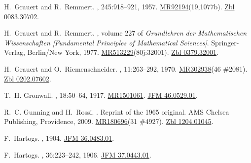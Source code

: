 \documentclass[11pt,a4paper, final, twoside]{article}
\numberwithin{equation}{section}
\begin{document}
\begin{appendices}
\begin{thebibliography}{100}
H.~Grauert and R.~Remmert.
, 245:918--921, 1957.
\newblock
  \href{http://www.ams.org/mathscinet-getitem?mr=92194}{MR92194}(19,1077b).
  \href{http://zbmath.org/?q=an:0083.30702}{Zbl 0083.30702}.

H.~Grauert and R.~Remmert.
, volume 227 of {\em
  Grundlehren der Mathematischen Wissenschaften [Fundamental Principles of
  Mathematical Sciences]}.
\newblock Springer-Verlag, Berlin/New York, 1977.
\newblock
  \href{http://www.ams.org/mathscinet-getitem?mr=513229}{MR513229}(80j:32001).
  \href{http://zbmath.org/?q=an:0379.32001}{Zbl 0379.32001}.

H.~Grauert and O.~Riemenschneider.
, 11:263--292, 1970.
\newblock \href{http://www.ams.org/mathscinet-getitem?mr=302938}{MR302938}(46
  \#2081). \href{http://zbmath.org/?q=an:0202.07602}{Zbl 0202.07602}.

T.~H. Gronwall.
, 18:50--64,
  1917.
\newblock \href{http://www.ams.org/mathscinet-getitem?mr=1501061}{MR1501061}.
  \href{http://zbmath.org/?q=an:46.0529.01}{JFM 46.0529.01}.

R.~C. Gunning and H.~Rossi.
.
\newblock Reprint of the 1965 original. AMS Chelsea Publishing, Providence,
  2009.
\newblock \href{http://www.ams.org/mathscinet-getitem?mr=180696}{MR180696}(31
  \#4927). \href{http://zbmath.org/?q=an:1204.01045}{Zbl 1204.01045}.

F.~Hartogs.
, 1904.
\newblock \href{http://zbmath.org/?q=an:36.0483.01}{JFM 36.0483.01}.

F.~Hartogs.
,
  36:223--242, 1906.
\newblock \href{http://zbmath.org/?q=an:37.0443.01}{JFM 37.0443.01}.


\end{thebibliography}
\end{appendices}
\end{document}
